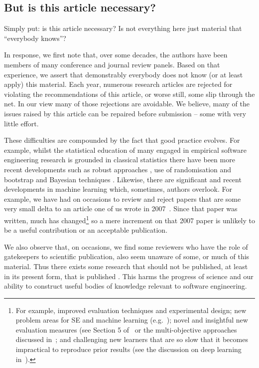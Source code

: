\documentclass[preprint,10pt]{elsarticle}
\begin{document}
\subsection{But is this article necessary?}
Simply put: is this article necessary? Is not everything here just material that ``everybody knows''?

In response, we first note that, over some decades, the authors have been members of many conference and journal review panels. Based on that experience, we assert that demonstrably everybody does not know (or at least apply) this material.  Each year, numerous research articles are rejected for violating the recommendations of this article, or worse still, some slip through the net.  In our view many of those rejections are avoidable. We believe, many of the issues raised by this article can be repaired before submission -- some with very little effort.

These difficulties are compounded by the fact that good practice evolves.  For example, whilst the statistical education of many engaged in empirical software engineering research is grounded in classical statistics there have been more recent developments such as robust approaches \cite{Kitc17}, use of randomisation and bootstrap \cite{Carp00} and Bayesian techniques \cite{Gelm13}.  Likewise, there are significant and recent developments in machine learning which, sometimes, authors overlook. For example, we have had on occasions to review and reject papers that are some very small delta to an article one of us wrote in 2007~\cite{menzies07}. Since that paper was written, much has changed\footnote{For example, improved evaluation techniques and experimental design; new problem areas for SE and machine learning (e.g.~\cite{sarkar2015cost});
 novel and insightful new evaluation measures (see Section 5 of~\cite{huang2017supervised} or the multi-objective approaches discussed in~\cite{nair2018data}; and challenging new learners that are so slow that it becomes impractical to reproduce prior results (see the discussion on deep learning in~\cite{fu2017easy}).} so a mere increment on that 2007 paper is unlikely to be a useful contribution or an acceptable publication. 

We also observe that, on occasions, we find some reviewers who have the role of gatekeepers to scientific publication, also seem unaware of some, or much of this material.  Thus there exists some research that should not be published, at least in its present form, that is published \cite{Kitc02,Jorg16}.  This harms the progress of science and our ability to construct useful bodies of knowledge relevant to software engineering.
 
\end{document}
